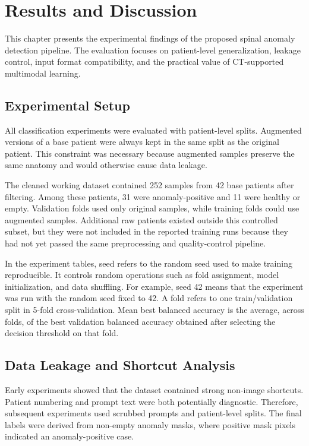 \chapter{Results and Discussion}
\label{ch:results}

This chapter presents the experimental findings of the proposed spinal anomaly detection pipeline. The evaluation focuses on patient-level generalization, leakage control, input format compatibility, and the practical value of CT-supported multimodal learning.

\section{Experimental Setup}
All classification experiments were evaluated with patient-level splits. Augmented versions of a base patient were always kept in the same split as the original patient. This constraint was necessary because augmented samples preserve the same anatomy and would otherwise cause data leakage.

The cleaned working dataset contained 252 samples from 42 base patients after filtering. Among these patients, 31 were anomaly-positive and 11 were healthy or empty. Validation folds used only original samples, while training folds could use augmented samples. Additional raw patients existed outside this controlled subset, but they were not included in the reported training runs because they had not yet passed the same preprocessing and quality-control pipeline.

In the experiment tables, seed refers to the random seed used to make training reproducible. It controls random operations such as fold assignment, model initialization, and data shuffling. For example, seed 42 means that the experiment was run with the random seed fixed to 42. A fold refers to one train/validation split in 5-fold cross-validation. Mean best balanced accuracy is the average, across folds, of the best validation balanced accuracy obtained after selecting the decision threshold on that fold.

\section{Data Leakage and Shortcut Analysis}
Early experiments showed that the dataset contained strong non-image shortcuts. Patient numbering and prompt text were both potentially diagnostic. Therefore, subsequent experiments used scrubbed prompts and patient-level splits. The final labels were derived from non-empty anomaly masks, where positive mask pixels indicated an anomaly-positive case.

